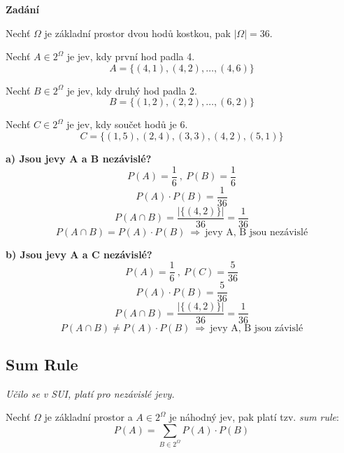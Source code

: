 \begin{compactitem}
    \item \textbf{Zadání} \begin{compactitem}
        \item Nechť $\Omega$ je základní prostor dvou hodů kostkou, pak $|\Omega| = 36$.

        \item Nechť $A \in 2^{\Omega}$ je jev, kdy první hod padla 4.
        $$ A = \{ (4,1), (4,2), \ldots, (4,6) \}$$

        \item Nechť $B \in 2^{\Omega}$ je jev, kdy druhý hod padla 2.
        $$ B = \{ (1,2), (2,2), \ldots, (6,2) \}$$

        \item Nechť $C \in 2^{\Omega}$ je jev, kdy součet hodů je 6.
        $$ C = \{ (1,5), (2,4), (3,3), (4,2), (5,1) \}$$
    \end{compactitem}

    \item \textbf{a) Jsou jevy A a B nezávislé?}
    $$\displaystyle{ P(A) = \frac{1}{6} ~,~ P(B) = \frac{1}{6}}$$
    $$\displaystyle{ P(A) \cdot P(B) = \frac{1}{36} }$$
    $$\displaystyle{ P(A \cap B) = \frac{|\{ (4,2) \}|}{36} = \frac{1}{36} }$$
    $$ P(A \cap B) = P(A) \cdot P(B) ~\Rightarrow~ \text{jevy A, B jsou nezávislé} $$

    \item \textbf{b) Jsou jevy A a C nezávislé?}
    $$\displaystyle{ P(A) = \frac{1}{6} ~,~ P(C) = \frac{5}{36}}$$
    $$\displaystyle{ P(A) \cdot P(B) = \frac{5}{36} }$$
    $$\displaystyle{ P(A \cap B) = \frac{|\{ (4,2) \}|}{36} = \frac{1}{36} }$$
    $$ P(A \cap B) \not= P(A) \cdot P(B) ~\Rightarrow~ \text{jevy A, B jsou závislé} $$
\end{compactitem}

\subsection{Sum Rule}

\begin{compactitem}
    \item \textit{Učilo se v SUI, platí pro nezávislé jevy.}

    \item Nechť $\Omega$ je základní prostor a $A \in 2^{\Omega}$ je náhodný jev, pak platí tzv. \textit{sum rule}:
    $$ P(A) = \sum_{B \in 2^{\Omega}} P(A) \cdot P(B)$$
\end{compactitem}

